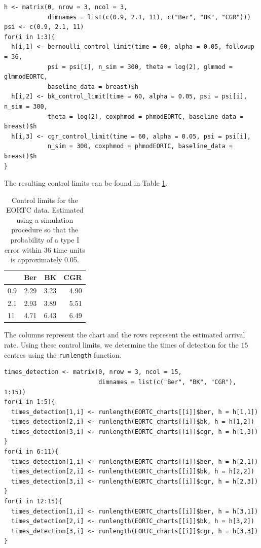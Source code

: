 \begin{verbatim}
h <- matrix(0, nrow = 3, ncol = 3, 
            dimnames = list(c(0.9, 2.1, 11), c("Ber", "BK", "CGR")))
psi <- c(0.9, 2.1, 11)
for(i in 1:3){
  h[i,1] <- bernoulli_control_limit(time = 60, alpha = 0.05, followup = 36,
            psi = psi[i], n_sim = 300, theta = log(2), glmmod =  glmmodEORTC,
            baseline_data = breast)$h
  h[i,2] <- bk_control_limit(time = 60, alpha = 0.05, psi = psi[i], n_sim = 300,
            theta = log(2), coxphmod = phmodEORTC, baseline_data = breast)$h
  h[i,3] <- cgr_control_limit(time = 60, alpha = 0.05, psi = psi[i],
            n_sim = 300, coxphmod = phmodEORTC, baseline_data = breast)$h
}
\end{verbatim}

The resulting control limits can be found in Table \ref{tab:htable-static}.

\begin{table}

\caption{\label{tab:htable-static}Control limits for the EORTC data. Estimated using a simulation procedure so that the probability of a type I error within 36 time units is approximately 0.05.}
\centering
\begin{tabular}[t]{l|r|r|r}
\hline
  & Ber & BK & CGR\\
\hline
0.9 & 2.29 & 3.23 & 4.90\\
\hline
2.1 & 2.93 & 3.89 & 5.51\\
\hline
11 & 4.71 & 6.43 & 6.49\\
\hline
\end{tabular}
\end{table}

The columns represent the chart and the rows represent the estimated arrival rate. Using these control limits, we determine the times of detection for the \(15\) centres using the \texttt{runlength} function.

\begin{verbatim}
times_detection <- matrix(0, nrow = 3, ncol = 15, 
                          dimnames = list(c("Ber", "BK", "CGR"), 1:15))
for(i in 1:5){
  times_detection[1,i] <- runlength(EORTC_charts[[i]]$ber, h = h[1,1])
  times_detection[2,i] <- runlength(EORTC_charts[[i]]$bk, h = h[1,2])
  times_detection[3,i] <- runlength(EORTC_charts[[i]]$cgr, h = h[1,3])
}
for(i in 6:11){
  times_detection[1,i] <- runlength(EORTC_charts[[i]]$ber, h = h[2,1])
  times_detection[2,i] <- runlength(EORTC_charts[[i]]$bk, h = h[2,2])
  times_detection[3,i] <- runlength(EORTC_charts[[i]]$cgr, h = h[2,3])
}
for(i in 12:15){
  times_detection[1,i] <- runlength(EORTC_charts[[i]]$ber, h = h[3,1])
  times_detection[2,i] <- runlength(EORTC_charts[[i]]$bk, h = h[3,2])
  times_detection[3,i] <- runlength(EORTC_charts[[i]]$cgr, h = h[3,3])
}
\end{verbatim}

